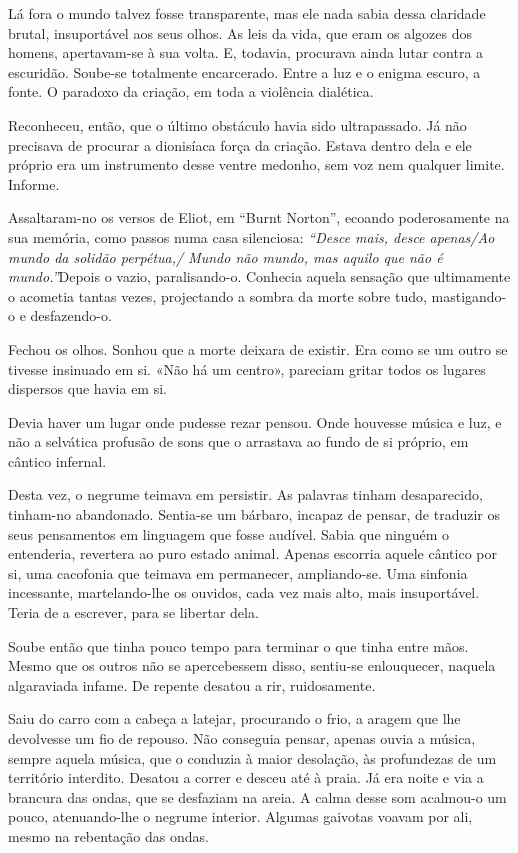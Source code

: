 Lá fora o mundo talvez fosse transparente, mas ele nada sabia dessa
claridade brutal, insuportável aos seus olhos. As leis da vida, que eram
os algozes dos homens, apertavam-se à sua volta. E, todavia, procurava
ainda lutar contra a escuridão. Soube-se totalmente encarcerado. Entre a
luz e o enigma escuro, a fonte. O paradoxo da criação, em toda a
violência dialética.

Reconheceu, então, que o último obstáculo havia sido ultrapassado. Já
não precisava de procurar a dionisíaca força da criação. Estava dentro
dela e ele próprio era um instrumento desse ventre medonho, sem voz nem
qualquer limite. Informe.

Assaltaram-no os versos de Eliot, em ``Burnt Norton'', ecoando
poderosamente na sua memória, como passos numa casa silenciosa:\emph{
``Desce mais, desce apenas/Ao mundo da solidão perpétua,/ Mundo não
mundo, mas aquilo que não é mundo.''}Depois o vazio, paralisando-o.
Conhecia aquela sensação que ultimamente o acometia tantas vezes,
projectando a sombra da morte sobre tudo, mastigando-o e desfazendo-o.

Fechou os olhos. Sonhou que a morte deixara de existir. Era como se um
outro se tivesse insinuado em si. «Não há um centro», pareciam gritar
todos os lugares dispersos que havia em si.

Devia haver um lugar onde pudesse rezar pensou. Onde houvesse música e
luz, e não a selvática profusão de sons que o arrastava ao fundo de si
próprio, em cântico infernal.

Desta vez, o negrume teimava em persistir. As palavras tinham
desaparecido, tinham-no abandonado. Sentia-se um bárbaro, incapaz de
pensar, de traduzir os seus pensamentos em linguagem que fosse audível.
Sabia que ninguém o entenderia, revertera ao puro estado animal. Apenas
escorria aquele cântico por si, uma cacofonia que teimava em permanecer,
ampliando-se. Uma sinfonia incessante, martelando-lhe os ouvidos, cada
vez mais alto, mais insuportável. Teria de a escrever, para se libertar
dela.

Soube então que tinha pouco tempo para terminar o que tinha entre mãos.
Mesmo que os outros não se apercebessem disso, sentiu-se enlouquecer,
naquela algaraviada infame. De repente desatou a rir, ruidosamente.

Saiu do carro com a cabeça a latejar, procurando o frio, a aragem que
lhe devolvesse um fio de repouso. Não conseguia pensar, apenas ouvia a
música, sempre aquela música, que o conduzia à maior desolação, às
profundezas de um território interdito. Desatou a correr e desceu até à
praia. Já era noite e via a brancura das ondas, que se desfaziam na
areia. A calma desse som acalmou-o um pouco, atenuando-lhe o negrume
interior. Algumas gaivotas voavam por ali, mesmo na rebentação das
ondas.

